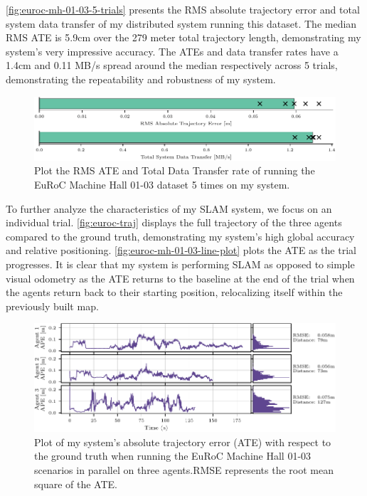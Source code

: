 
\autoref{fig:euroc-mh-01-03-5-trials} presents the RMS absolute trajectory error and total system data transfer of my distributed system running this dataset. The median RMS ATE is 5.9cm over the 279 meter total trajectory length, demonstrating my system's very impressive accuracy. The ATEs and data transfer rates have a 1.4cm and 0.11 MB/s spread around the median respectively across 5 trials, demonstrating the repeatability and robustness of my system.

\begin{figure}[h]
    \centering
    \includegraphics[width=\linewidth]{figures/comparison_apr11_mh_trajectory_b.pdf}

    \caption{Plot the RMS ATE and Total Data Transfer rate of running the EuRoC Machine Hall 01-03 dataset 5 times on my system.}
    \label{fig:euroc-mh-01-03-5-trials}
\end{figure}

To further analyze the characteristics of my SLAM system, we focus on an individual trial. \autoref{fig:euroc-traj} displays the full trajectory of the three agents compared to the ground truth, demonstrating my system's high global accuracy and relative positioning. \autoref{fig:euroc-mh-01-03-line-plot} plots the ATE as the trial progresses. It is clear that my system is performing SLAM as opposed to simple visual odometry as the ATE returns to the baseline at the end of the trial when the agents return back to their starting position, relocalizing itself within the previously built map.

\begin{figure}[h]
    \centering
    \includegraphics[width=\linewidth]{figures/EuRoC_MH_01-03_line_plot.pdf}

    \caption{Plot of my system's absolute trajectory error (ATE) with respect to the ground truth when running the EuRoC Machine Hall 01-03 scenarios in parallel on three agents.\captionbreak RMSE represents the root mean square of the ATE.}
    \label{fig:euroc-mh-01-03-line-plot}
\end{figure}


